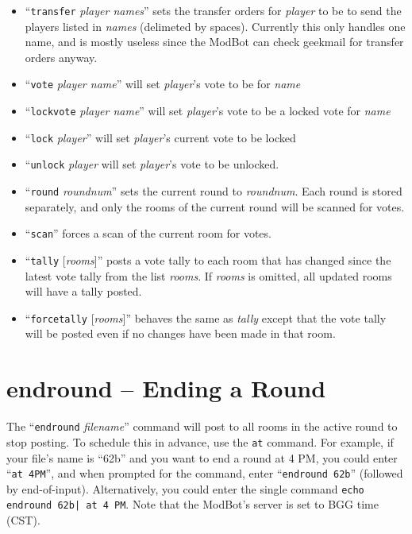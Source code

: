 \documentclass{report}
\begin{document}
\begin{itemize}
\item ``\texttt{transfer} \textit{player names}'' sets the transfer orders for \textit{player} to be to send the players listed in \textit{names} (delimeted by spaces). Currently this only handles one name, and is mostly useless since the ModBot can check geekmail for transfer orders anyway.
\item ``\texttt{vote} \textit{player name}'' will set \textit{player}'s vote to be for \textit{name}
\item ``\texttt{lockvote} \textit{player name}'' will set \textit{player}'s vote to be a locked vote for \textit{name}
\item ``\texttt{lock} \textit{player}'' will set \textit{player}'s current vote to be locked
\item ``\texttt{unlock} \textit{player} will set \textit{player}'s vote to be unlocked.
\item ``\texttt{round} \textit{roundnum}'' sets the current round to \textit{roundnum}. Each round is stored separately, and only the rooms of the current round will be scanned for votes.
\item ``\texttt{scan}'' forces a scan of the current room for votes.
\item ``\texttt{tally} [\textit{rooms}]'' posts a vote tally to each room that has changed since the latest vote tally from the list \textit{rooms}. If \textit{rooms} is omitted, all updated rooms will have a tally posted.
\item ``\texttt{forcetally} [\textit{rooms}]'' behaves the same as \textit{tally} except that the vote tally will be posted even if no changes have been made in that room.
\end{itemize}

\chapter{endround -- Ending a Round}
The ``\texttt{endround} \textit{filename}'' command will post to all rooms in the active round to stop posting. To schedule this in advance, use the \texttt{at} command. For example, if your file's name is ``62b'' and you want to end a round at 4 PM, you could enter ``\texttt{at 4PM}'', and when prompted for the command, enter ``\texttt{endround 62b}'' (followed by end-of-input). Alternatively, you could enter the single command \texttt{echo \textquotedbl endround 62b\textquotedbl | at 4 PM}.
Note that the ModBot's server is set to BGG time (CST).
\end{document}
